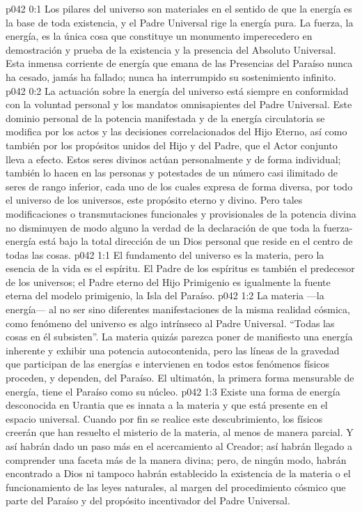 \author{Mensajero poderoso}
\vs p042 0:1 Los pilares del universo son materiales en el sentido de que la energía es la base de toda existencia, y el Padre Universal rige la energía pura. La fuerza, la energía, es la única cosa que constituye un monumento imperecedero en demostración y prueba de la existencia y la presencia del Absoluto Universal. Esta inmensa corriente de energía que emana de las Presencias del Paraíso nunca ha cesado, jamás ha fallado; nunca ha interrumpido su sostenimiento infinito.
\vs p042 0:2 La actuación sobre la energía del universo está siempre en conformidad con la voluntad personal y los mandatos omnisapientes del Padre Universal. Este dominio personal de la potencia manifestada y de la energía circulatoria se modifica por los actos y las decisiones correlacionados del Hijo Eterno, así como también por los propósitos unidos del Hijo y del Padre, que el Actor conjunto lleva a efecto. Estos seres divinos actúan personalmente y de forma individual; también lo hacen en las personas y potestades de un número casi ilimitado de seres de rango inferior, cada uno de los cuales expresa de forma diversa, por todo el universo de los universos, este propósito eterno y divino. Pero tales modificaciones o transmutaciones funcionales y provisionales de la potencia divina no disminuyen de modo alguno la verdad de la declaración de que toda la fuerza\hyp{}energía está bajo la total dirección de un Dios personal que reside en el centro de todas las cosas.
\vs p042 1:1 El fundamento del universo es la materia, pero la esencia de la vida es el espíritu. El Padre de los espíritus es también el predecesor de los universos; el Padre eterno del Hijo Primigenio es igualmente la fuente eterna del modelo primigenio, la Isla del Paraíso.
\vs p042 1:2 La materia ---la energía--- al no ser sino diferentes manifestaciones de la misma realidad cósmica, como fenómeno del universo es algo intrínseco al Padre Universal. “Todas las cosas en él subsisten”. La materia quizás parezca poner de manifiesto una energía inherente y exhibir una potencia autocontenida, pero las líneas de la gravedad que participan de las energías e intervienen en todos estos fenómenos físicos proceden, y dependen, del Paraíso. El ultimatón, la primera forma mensurable de energía, tiene el Paraíso como su núcleo.
\vs p042 1:3 \pc Existe una forma de energía desconocida en Urantia que es innata a la materia y que está presente en el espacio universal. Cuando por fin se realice este descubrimiento, los físicos creerán que han resuelto el misterio de la materia, al menos de manera parcial. Y así habrán dado un paso más en el acercamiento al Creador; así habrán llegado a comprender una faceta más de la manera divina; pero, de ningún modo, habrán encontrado a Dios ni tampoco habrán establecido la existencia de la materia o el funcionamiento de las leyes naturales, al margen del procedimiento cósmico que parte del Paraíso y del propósito incentivador del Padre Universal.
